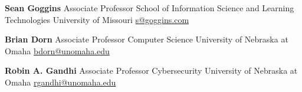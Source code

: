 \documentclass[letterpaper,MMMyyyy,nonstopmode]{simpleresumecv}
\begin{document}
\begin{Body}
\BigGap
\BulletItem
\textbf{Sean Goggins}
\newline
Associate Professor
\newline
School of Information Science and Learning Technologies
\newline
University of Missouri
\newline
\href{mailto:s@goggins.com}
{s@goggins.com}

\BigGap
\BulletItem
\textbf{Brian Dorn}
\newline
Associate Professor
\newline
Computer Science
\newline
University of Nebraska at Omaha
\newline
\href{mailto:bdorn@unomaha.edu}
{bdorn@unomaha.edu}

\BigGap
\BulletItem
\textbf{Robin A. Gandhi}
\newline
Associate Professor
\newline
Cybersecurity
\newline
University of Nebraska at Omaha
\newline
\href{mailto:rgandhi@unomaha.edu}
{rgandhi@unomaha.edu}





\end{Body}
\end{document}
